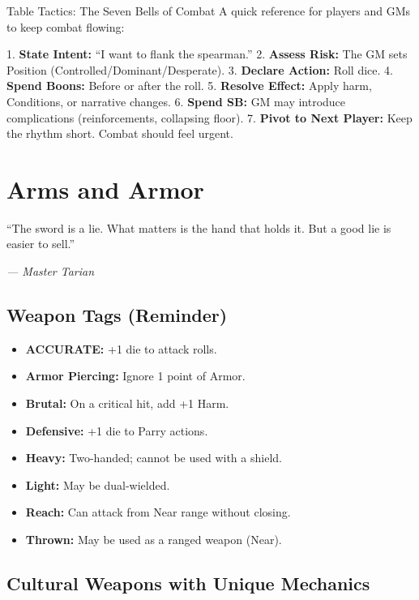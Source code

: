 \documentclass[9pt,a5paper]{extbook}
\begin{document}
\begin{warriorbox}{Table Tactics: The Seven Bells of Combat}
A quick reference for players and GMs to keep combat flowing:

1. \textbf{State Intent:} ``I want to flank the spearman.''
2. \textbf{Assess Risk:} The GM sets Position (Controlled/Dominant/Desperate).
3. \textbf{Declare Action:} Roll dice.
4. \textbf{Spend Boons:} Before or after the roll.
5. \textbf{Resolve Effect:} Apply harm, Conditions, or narrative changes.
6. \textbf{Spend SB:} GM may introduce complications (reinforcements, collapsing floor).
7. \textbf{Pivot to Next Player:} Keep the rhythm short. Combat should feel urgent.
\end{warriorbox}

\clearpage

\chapter{Arms and Armor}
\epigraph{``The sword is a lie. What matters is the hand that holds it. But a good lie is easier to sell.''}{\textit{--- Master Tarian}}

\section{Weapon Tags (Reminder)}

\begin{itemize}
    \item \textbf{ACCURATE:} +1 die to attack rolls.
    \item \textbf{Armor Piercing:} Ignore 1 point of Armor.
    \item \textbf{Brutal:} On a critical hit, add +1 Harm.
    \item \textbf{Defensive:} +1 die to Parry actions.
    \item \textbf{Heavy:} Two-handed; cannot be used with a shield.
    \item \textbf{Light:} May be dual-wielded.
    \item \textbf{Reach:} Can attack from Near range without closing.
    \item \textbf{Thrown:} May be used as a ranged weapon (Near).
\end{itemize}

\section{Cultural Weapons with Unique Mechanics}
\end{document}
